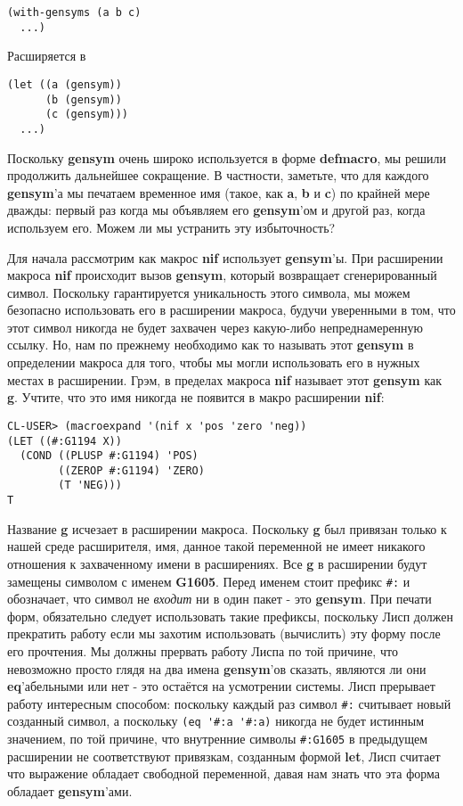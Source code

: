 \begin{verbatim}
(with-gensyms (a b c)
  ...)
\end{verbatim}

Расширяется в

\begin{verbatim}
(let ((a (gensym))
      (b (gensym))
      (c (gensym)))
  ...)
\end{verbatim}

Поскольку \textbf{gensym} очень широко используется в форме \textbf{defmacro}, мы решили продолжить дальнейшее сокращение. В частности, заметьте, что для каждого \textbf{gensym}'а мы печатаем временное имя (такое, как \textbf{a}, \textbf{b} и \textbf{c}) по крайней мере дважды: первый раз когда мы объявляем его \textbf{gensym}'ом и другой раз, когда используем его. Можем ли мы устранить эту избыточность?

Для начала рассмотрим как макрос \textbf{nif} использует \textbf{gensym}'ы. При расширении макроса \textbf{nif} происходит вызов \textbf{gensym}, который возвращает сгенерированный символ. Поскольку гарантируется уникальность этого символа, мы можем безопасно использовать его в расширении макроса, будучи уверенными в том, что этот символ никогда не будет захвачен через какую-либо непреднамеренную ссылку. Но, нам по прежнему необходимо как то называть этот \textbf{gensym} в определении макроса для того, чтобы мы могли использовать его в нужных местах в расширении. Грэм, в пределах макроса \textbf{nif} называет этот \textbf{gensym} как \textbf{g}. Учтите, что это имя никогда не появится в макро расширении \textbf{nif}:

\begin{verbatim}
CL-USER> (macroexpand '(nif x 'pos 'zero 'neg))
(LET ((#:G1194 X))
  (COND ((PLUSP #:G1194) 'POS) 
        ((ZEROP #:G1194) 'ZERO) 
        (T 'NEG)))
T
\end{verbatim}

Название \textbf{g} исчезает в расширении макроса. Поскольку \textbf{g} был привязан только к нашей среде расширителя, имя, данное такой переменной не имеет никакого отношения к захваченному имени в расширениях. Все \textbf{g} в расширении будут замещены символом с именем \textbf{G1605}. Перед именем стоит префикс \verb"#:" и обозначает, что символ не \emph{входит} ни в один пакет - это \textbf{gensym}. При печати форм, обязательно следует использовать такие префиксы, поскольку Лисп должен прекратить работу если мы захотим использовать (вычислить) эту форму после его прочтения. Мы должны прервать работу Лиспа по той причине, что невозможно просто глядя на два имена \textbf{gensym}'ов сказать, являются ли они \textbf{eq}'абельными или нет - это остаётся на усмотрении системы. Лисп прерывает работу интересным способом: поскольку каждый раз символ \verb"#:" считывает новый созданный символ, а поскольку \verb"(eq '#:a '#:a)" никогда не будет истинным значением, по той причине, что внутренние символы \verb"#:G1605" в предыдущем расширении не соответствуют привязкам, созданным формой \textbf{let}, Лисп считает что выражение обладает свободной переменной, давая нам знать что эта форма обладает \textbf{gensym}'ами.

